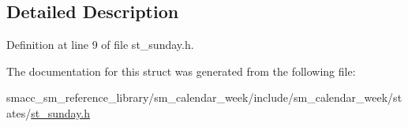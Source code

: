 \subsection{Detailed Description}


Definition at line 9 of file st\+\_\+sunday.\+h.



The documentation for this struct was generated from the following file\+:\begin{DoxyCompactItemize}
\item 
smacc\+\_\+sm\+\_\+reference\+\_\+library/sm\+\_\+calendar\+\_\+week/include/sm\+\_\+calendar\+\_\+week/states/\hyperlink{st__sunday_8h}{st\+\_\+sunday.\+h}\end{DoxyCompactItemize}

